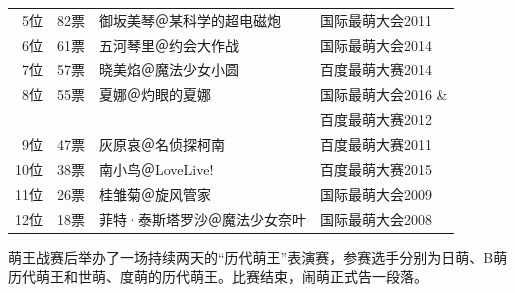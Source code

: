 {\begin{longtable}{rrll}
5位 & 82票 & 御坂美琴＠某科学的超电磁炮 & 国际最萌大会2011 \\
6位 & 61票 & 五河琴里＠约会大作战 & 国际最萌大会2014 \\
7位 & 57票 & 晓美焰＠魔法少女小圆 & 百度最萌大赛2014 \\
8位 & 55票 & 夏娜＠灼眼的夏娜 & 国际最萌大会2016 \&\\
 &  &  & 百度最萌大赛2012\\
9位 & 47票 & 灰原哀＠名侦探柯南 & 百度最萌大赛2011 \\
10位 & 38票 & 南小鸟＠$\!$LoveLive! & 百度最萌大赛2015 \\
11位 & 26票 & 桂雏菊＠旋风管家 & 国际最萌大会2009 \\
12位 & 18票 & 菲特·泰斯塔罗沙＠魔法少女奈叶 & 国际最萌大会2008 \\
\end{longtable}}

萌王战赛后举办了一场持续两天的“历代萌王”表演赛，参赛选手分别为日萌、B萌历代萌王和世萌、度萌的历代萌王。比赛结束，闹萌正式告一段落。
